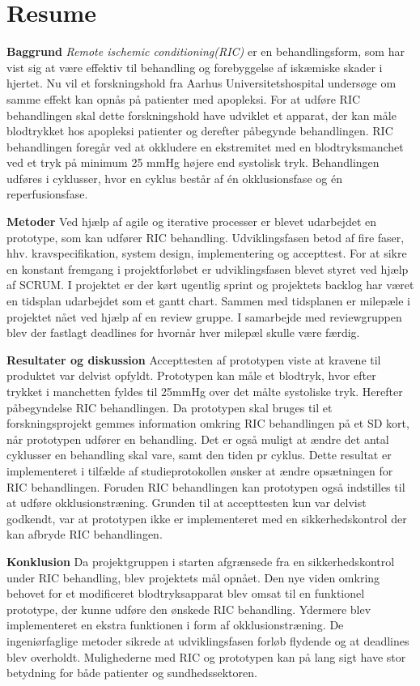\chapter*{Resume}
\textbf{Baggrund}
\textit{Remote ischemic conditioning(RIC)} er en behandlingsform, som har vist sig at være effektiv til behandling og forebyggelse af iskæmiske skader i hjertet. Nu vil et forskningshold fra Aarhus Universitetshospital undersøge om samme effekt kan opnås på patienter med apopleksi. For at udføre RIC behandlingen skal dette forskningshold have udviklet et apparat, der kan måle blodtrykket hos apopleksi patienter og derefter påbegynde behandlingen. RIC behandlingen foregår ved at okkludere en ekstremitet med en blodtryksmanchet ved et tryk på minimum 25 mmHg højere end systolisk tryk. Behandlingen udføres i cyklusser, hvor en cyklus består af én okklusionsfase og én reperfusionsfase. 

\textbf{Metoder}
Ved hjælp af agile og iterative processer er blevet udarbejdet en prototype, som kan udfører RIC behandling. Udviklingsfasen betod af fire faser, hhv. kravspecifikation, system design, implementering og accepttest. For at sikre en konstant fremgang i projektforløbet er udviklingsfasen blevet styret ved hjælp af SCRUM. I projektet er der kørt ugentlig sprint og projektets backlog har været en tidsplan udarbejdet som et gantt chart. Sammen med tidsplanen er milepæle i projektet nået ved hjælp af en review gruppe. I samarbejde med reviewgruppen blev der fastlagt deadlines for hvornår hver milepæl skulle være færdig.

\textbf{Resultater og diskussion}
Accepttesten af prototypen viste at kravene til produktet var delvist opfyldt. Prototypen kan måle et blodtryk, hvor efter trykket i manchetten fyldes til 25mmHg over det målte systoliske tryk. Herefter påbegyndelse RIC behandlingen. Da prototypen skal bruges til et forskningsprojekt gemmes information omkring RIC behandlingen på et SD kort, når prototypen udfører en behandling. Det er også muligt at ændre det antal cyklusser en behandling skal vare, samt den tiden pr cyklus. Dette resultat er implementeret i tilfælde af studieprotokollen ønsker at ændre opsætningen for RIC behandlingen. Foruden RIC behandlingen kan prototypen også indstilles til at udføre okklusionstræning. Grunden til at accepttesten kun var delvist godkendt, var at prototypen ikke er implementeret med en sikkerhedskontrol der kan afbryde RIC behandlingen. 

\textbf{Konklusion}
Da projektgruppen i starten afgrænsede fra en sikkerhedskontrol under RIC behandling, blev projektets mål opnået. Den nye viden omkring behovet for et modificeret blodtryksapparat blev omsat til en funktionel prototype, der kunne udføre den ønskede RIC behandling. Ydermere blev implementeret en ekstra funktionen i form af okklusionstræning. De ingeniørfaglige metoder sikrede at udviklingsfasen forløb flydende og at deadlines blev overholdt. Mulighederne med RIC og prototypen kan på lang sigt have stor betydning for både patienter og sundhedssektoren.